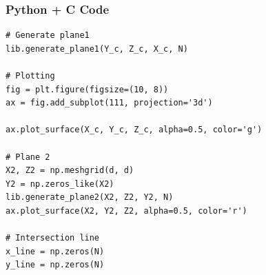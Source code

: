 \documentclass{beamer}
\begin{document}
\begin{frame}[fragile]
    \frametitle{Python + C Code}
    \begin{lstlisting}
# Generate plane1
lib.generate_plane1(Y_c, Z_c, X_c, N)

# Plotting
fig = plt.figure(figsize=(10, 8))
ax = fig.add_subplot(111, projection='3d')

ax.plot_surface(X_c, Y_c, Z_c, alpha=0.5, color='g')

# Plane 2
X2, Z2 = np.meshgrid(d, d)
Y2 = np.zeros_like(X2)
lib.generate_plane2(X2, Z2, Y2, N)
ax.plot_surface(X2, Y2, Z2, alpha=0.5, color='r')

# Intersection line
x_line = np.zeros(N)
y_line = np.zeros(N)

    \end{lstlisting}
\end{frame}
\end{document}
